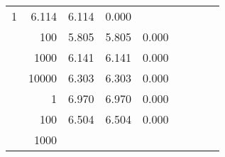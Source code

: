 \begin{table}
\begin{tabular}{rrrrrrrrr}
					\multirow{ 1 }{*}{ 1 } &
					
						
							    
							    
	                           6.114 & 6.114 & 0.000  \\
	                
	            
					 &  
					 
					\multirow{ 1 }{*}{ 100 } &
					
						
							    
							    
	                           5.805 & 5.805 & 0.000  \\
	                
	            
					 &  
					 
					\multirow{ 1 }{*}{ 1000 } &
					
						
							    
							    
	                           6.141 & 6.141 & 0.000  \\
	                
	            
					 &  
					 
					\multirow{ 1 }{*}{ 10000 } &
					
						
							    
							    
	                           6.303 & 6.303 & 0.000  \\
	                
	            
	        
				\noalign{\smallskip}\hline
				\multirow{ 4 }{*}{ 160000 } &
				
					
					 
					\multirow{ 1 }{*}{ 1 } &
					
						
							    
							    
	                           6.970 & 6.970 & 0.000  \\
	                
	            
					 &  
					 
					\multirow{ 1 }{*}{ 100 } &
					
						
							    
							    
	                           6.504 & 6.504 & 0.000  \\
	                
	            
					 &  
					 
					\multirow{ 1 }{*}{ 1000 } &
					
						
							    

\end{tabular}
\end{table}
